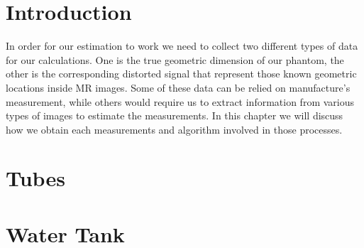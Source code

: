 \section{Introduction}
In order for our estimation to work we need to collect two different types of data for our calculations. 
One is the true geometric dimension of our phantom, the other is the corresponding distorted signal that
represent those known geometric locations inside MR images. Some of these data can be relied on manufacture's
measurement, while others would require us to extract information from various types of images to estimate the
measurements. In this chapter we will discuss how we obtain each measurements and algorithm involved in those
processes.

\section{Tubes}
\label{tubes}

\section{Water Tank}
\label{ct_tank}
